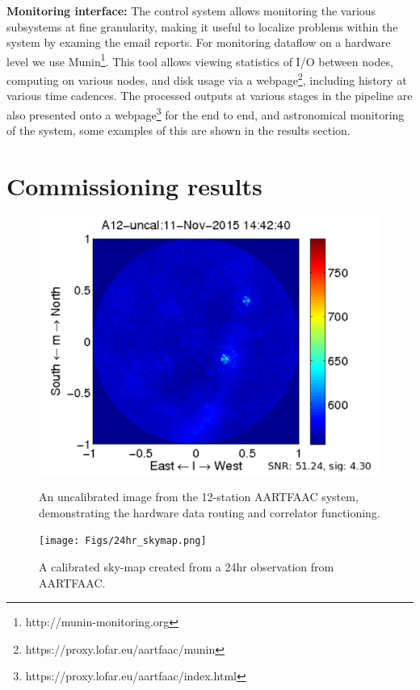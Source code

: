 \documentclass{ws-jai}
\begin{document}
\noindent \textbf  {Monitoring interface:} The control  system allows
monitoring the  various  subsystems at  fine  granularity,  making  it useful
to  localize problems within  the system by examing the email reports.  For
monitoring dataflow on a hardware level we use
Munin\footnote{http://munin-monitoring.org}. This tool allows viewing
statistics  of I/O between nodes,  computing on various nodes,  and disk usage
via    a   webpage\footnote{https://proxy.lofar.eu/aartfaac/munin},
including history  at various time  cadences.  The processed outputs  at
various stages in the pipeline are also presented onto a
webpage\footnote{https://proxy.lofar.eu/aartfaac/index.html} for the end to
end, and astronomical monitoring  of the system, some  examples of this are
shown in the results section.

\section {\label{sec:results} Commissioning results}
\begin{figure}[htbp]
 \begin {minipage}{\textwidth}
   \includegraphics[width=\textwidth]{Figs/A12_uncal.png}
\caption{An uncalibrated image from the 12-station AARTFAAC system, demonstrating the hardware data routing and  correlator functioning.}
\label{fig:afaac_results}
 \end {minipage}
 
\begin {minipage}{\textwidth}
   \texttt{[image: Figs/24hr\_skymap.png]}
\caption{A calibrated sky-map created from a 24hr observation from AARTFAAC.}
\label{fig:afaac_24hr}
 \end {minipage}
  
\end{figure}
\end{document}
